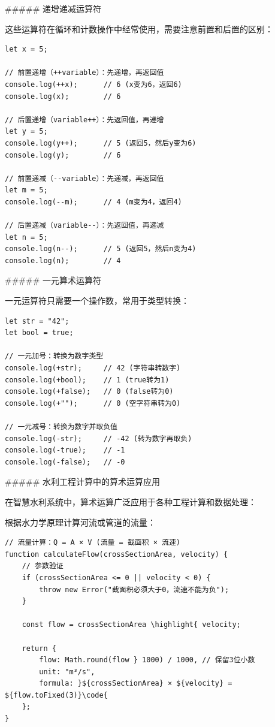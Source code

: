 {##### 递增递减运算符

这些运算符在循环和计数操作中经常使用，需要注意前置和后置的区别：

\begin{lstlisting}[style=javascript]
let x = 5;

// 前置递增（++variable）：先递增，再返回值
console.log(++x);      // 6 (x变为6，返回6)
console.log(x);        // 6

// 后置递增（variable++）：先返回值，再递增  
let y = 5;
console.log(y++);      // 5 (返回5，然后y变为6)
console.log(y);        // 6

// 前置递减（--variable）：先递减，再返回值
let m = 5;
console.log(--m);      // 4 (m变为4，返回4)

// 后置递减（variable--）：先返回值，再递减
let n = 5;
console.log(n--);      // 5 (返回5，然后n变为4)
console.log(n);        // 4
\end{lstlisting}

##### 一元算术运算符

一元运算符只需要一个操作数，常用于类型转换：

\begin{lstlisting}[style=javascript]
let str = "42";
let bool = true;

// 一元加号：转换为数字类型
console.log(+str);     // 42 (字符串转数字)
console.log(+bool);    // 1 (true转为1)
console.log(+false);   // 0 (false转为0)
console.log(+"");      // 0 (空字符串转为0)

// 一元减号：转换为数字并取负值
console.log(-str);     // -42 (转为数字再取负)
console.log(-true);    // -1
console.log(-false);   // -0
\end{lstlisting}

##### 水利工程计算中的算术运算应用

在智慧水利系统中，算术运算广泛应用于各种工程计算和数据处理：


根据水力学原理计算河流或管道的流量：

\begin{lstlisting}[style=javascript]
// 流量计算：Q = A × V (流量 = 截面积 × 流速)
function calculateFlow(crossSectionArea, velocity) {
    // 参数验证
    if (crossSectionArea <= 0 || velocity < 0) {
        throw new Error("截面积必须大于0，流速不能为负");
    }
    
    const flow = crossSectionArea \highlight{ velocity;
    
    return {
        flow: Math.round(flow } 1000) / 1000, // 保留3位小数
        unit: "m³/s",
        formula: }${crossSectionArea} × ${velocity} = ${flow.toFixed(3)}\code{
    };
}


\end{lstlisting}}
